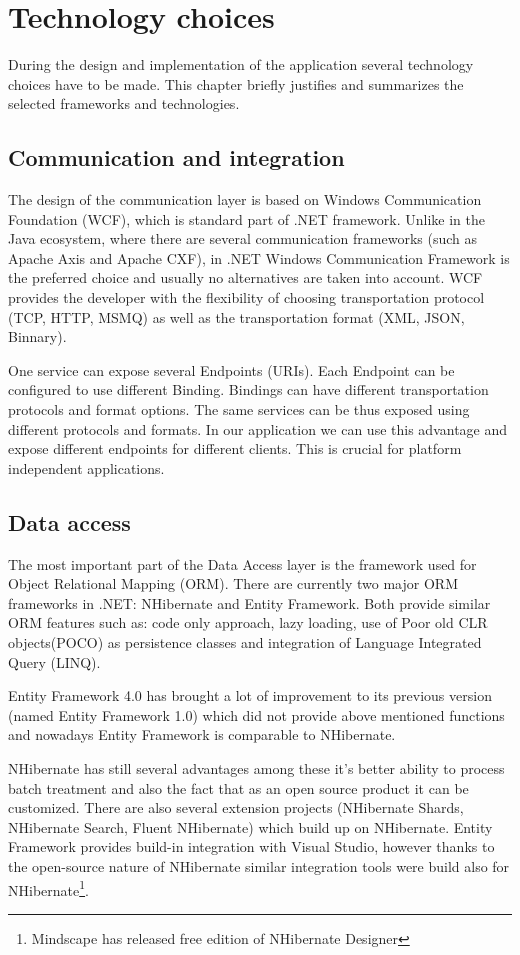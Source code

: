 \chapter{Technology choices}
During the design and implementation of the application several technology choices have to be made. This chapter briefly justifies and summarizes the selected frameworks and technologies.
\section{Communication and integration}
\label{tech:wcf}
The design of the communication layer is based on Windows Communication Foundation (WCF), which is standard part of .NET framework. Unlike in the Java ecosystem, where there are several communication frameworks (such as Apache Axis and Apache CXF), in .NET Windows Communication Framework is the preferred choice and usually no alternatives are taken into account. WCF provides the developer with the flexibility of choosing transportation protocol (TCP, HTTP, MSMQ) as well as the transportation format (XML, JSON, Binnary).

One service can expose several Endpoints (URIs). Each Endpoint can be configured to use different Binding. Bindings can have different transportation protocols and format options. The same services can be thus exposed using different protocols and formats. In our application we can use this advantage and expose different endpoints for different clients. This is crucial for platform independent applications.

\section{Data access}
\label{tech:data}
The most important part of the Data Access layer is the framework used for Object Relational Mapping (ORM). There are currently two major ORM frameworks in .NET:  NHibernate and Entity Framework. Both provide similar ORM features such as: code only approach, lazy loading, use of Poor old CLR objects(POCO) as persistence classes and integration of Language Integrated Query (LINQ).

Entity Framework 4.0 has brought a lot of improvement to its previous version (named Entity Framework 1.0) which did not provide above mentioned functions and nowadays Entity Framework is comparable to NHibernate.

NHibernate has still several advantages among these it's better ability to process batch treatment and also the fact that as an open source product it can be customized. There are also several extension projects (NHibernate Shards, NHibernate Search, Fluent NHibernate) which build up on NHibernate. Entity Framework provides build-in integration with Visual Studio, however thanks to the open-source nature of NHibernate similar integration tools were build also for NHibernate\footnote{Mindscape has released free edition of NHibernate Designer}.

